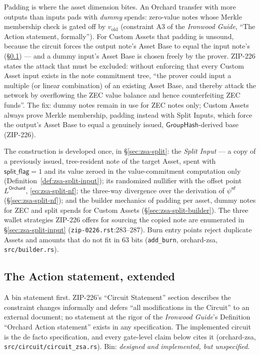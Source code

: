 \documentclass[11pt,a4paper]{article}
\theoremstyle{definition}
\newcommand{\nfsym}{\mathsf{nf}}
\newcommand{\GroupHash}{\ensuremath{\mathsf{GroupHash}}}
\begin{document}
Padding is where the asset dimension bites. An Orchard transfer with more
outputs than inputs pads with \emph{dummy} spends: zero-value notes whose
Merkle membership check is gated off by $v_{\mathrm{old}}$ (constraint A3 of
the \emph{Ironwood Guide}, ``The Action statement, formally''). For Custom
Assets that padding is unsound, because the circuit forces the output note's
Asset Base to equal the input note's (\S\ref{sec:zsa-circuit}) --- and a
dummy input's Asset Base is chosen freely by the prover. ZIP-226 states the
attack that must be excluded: without enforcing that every Custom Asset
input exists in the note commitment tree, ``the prover could input a
multiple (or linear combination) of an existing Asset Base, and thereby
attack the network by overflowing the ZEC value balance and hence
counterfeiting ZEC funds''. The fix: dummy notes remain in use for ZEC notes
only; Custom Assets always prove Merkle membership, padding instead with
Split Inputs, which force the output's Asset Base to equal a genuinely
issued, $\GroupHash$-derived base (ZIP-226).

The construction is developed once, in \S\ref{sec:zsa-split}: the
\emph{Split Input} --- a copy of a previously issued, tree-resident note
of the target Asset, spent with $\mathsf{split\_flag} = 1$ and its value
zeroed in the value-commitment computation only
(Definition~\ref{def:zsa-split-input}); its randomized nullifier with the
offset point $L^{\mathsf{Orchard}}$, \eqref{eq:zsa-split-nf}; the
three-way divergence over the derivation of $\psi^{\nfsym}$
(\S\ref{sec:zsa-split-nf}); and the builder mechanics of padding per
asset, dummy notes for ZEC and split spends for Custom Assets
(\S\ref{sec:zsa-split-builder}). The three wallet strategies ZIP-226
offers for sourcing the copied note are enumerated in
\S\ref{sec:zsa-split-input} (\texttt{zip-0226.rst}:283--287). Burn entry
points reject duplicate Assets and amounts that do not fit in $63$ bits
(\texttt{add\_burn}, \textsf{orchard-zsa}, \texttt{src/builder.rs}).

\subsection{The Action statement, extended}\label{sec:zsa-circuit}

A bin statement first. ZIP-226's ``Circuit Statement'' section describes the
constraint changes informally and defers ``all modifications in the
Circuit'' to an external document; no statement at the rigor of the
\emph{Ironwood Guide}'s Definition ``Orchard Action statement'' exists in any
specification. The implemented circuit is the de facto specification, and
every gate-level claim below cites it (\textsf{orchard-zsa},
\texttt{src/circuit/circuit\_zsa.rs}). Bin: \emph{designed and implemented,
but unspecified}.
\end{document}
